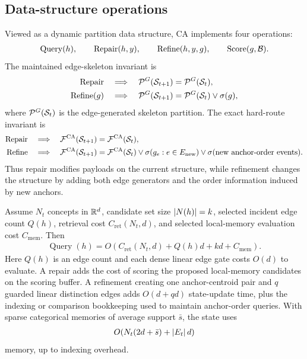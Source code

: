 \subsection{Data-structure operations}

\begin{definition}
\label{def:dgm-data-structure-operations}
Viewed as a dynamic partition data structure, CA implements four operations:
\begin{align*}
\operatorname{Query}(h),\qquad
\operatorname{Repair}(h,y),\qquad
\operatorname{Refine}(h,y,g),\qquad
\operatorname{Score}(g,\mathcal{B}).
\end{align*}
The maintained edge-skeleton invariant is
\begin{align*}
\operatorname{Repair}\quad&\Longrightarrow\quad \mathcal{P}^G(\mathcal{S}_{t+1})=\mathcal{P}^G(\mathcal{S}_t),\\
\operatorname{Refine}(g)\quad&\Longrightarrow\quad \mathcal{P}^G(\mathcal{S}_{t+1})=\mathcal{P}^G(\mathcal{S}_t)\vee\sigma(g),
\end{align*}
where $\mathcal{P}^G(\mathcal{S}_t)$ is the edge-generated skeleton partition. The exact hard-route invariant is
\begin{align*}
\operatorname{Repair}\quad&\Longrightarrow\quad \mathcal{F}^{\mathrm{CA}}(\mathcal{S}_{t+1})=\mathcal{F}^{\mathrm{CA}}(\mathcal{S}_t),\\
\operatorname{Refine}\quad&\Longrightarrow\quad \mathcal{F}^{\mathrm{CA}}(\mathcal{S}_{t+1})
=
\mathcal{F}^{\mathrm{CA}}(\mathcal{S}_t)\vee\sigma(g_e:e\in E_{\mathrm{new}})\vee\sigma(\text{new anchor-order events}).
\end{align*}
Thus repair modifies payloads on the current structure, while refinement changes the structure by adding both edge generators and the order information induced by new anchors.
\end{definition}

\begin{theorem}
\label{thm:dgm-data-structure-main}
Assume $N_t$ concepts in $\mathbb{R}^d$, candidate set size $\left\lvert N(h)\right\rvert=k$, selected incident edge count $Q(h)$, retrieval cost $C_{\mathrm{ret}}(N_t,d)$, and selected local-memory evaluation cost $C_{\mathrm{mem}}$. Then
\begin{align*}
\operatorname{Query}(h)
=
O(C_{\mathrm{ret}}(N_t,d)+Q(h)d+kd+C_{\mathrm{mem}}).
\end{align*}
Here $Q(h)$ is an edge count and each dense linear edge gate costs $O(d)$ to evaluate. A repair adds the cost of scoring the proposed local-memory candidates on the scoring buffer. A refinement creating one anchor-centroid pair and $q$ guarded linear distinction edges adds $O(d+qd)$ state-update time, plus the indexing or comparison bookkeeping used to maintain anchor-order queries. With sparse categorical memories of average support $\bar s$, the state uses
\begin{align*}
O(N_t(2d+\bar s)+\left\lvert E_t\right\rvert d)
\end{align*}
memory, up to indexing overhead.
\end{theorem}

